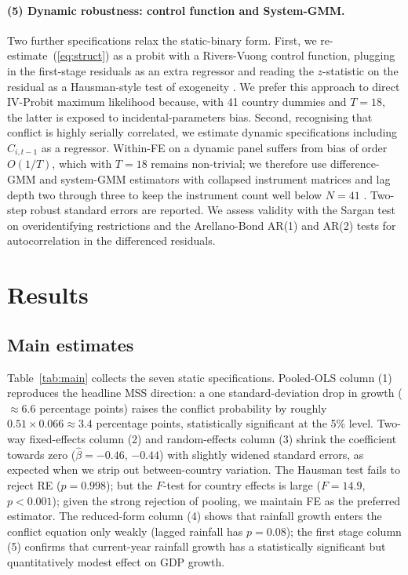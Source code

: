 \documentclass[11pt,a4paper]{article}
\begin{document}
\paragraph{(5) Dynamic robustness: control function and System-GMM.}
Two further specifications relax the static-binary form. First, we
re-estimate~(\ref{eq:struct}) as a probit with a Rivers-Vuong
control function, plugging in the first-stage residuals as an extra
regressor and reading the $z$-statistic on the residual as a
Hausman-style test of exogeneity \citep{Wooldridge2010}. We prefer
this approach to direct IV-Probit maximum likelihood because, with
41 country dummies and $T=18$, the latter is exposed to
incidental-parameters bias. Second, recognising that conflict is highly
serially correlated, we estimate dynamic specifications including
$C_{i,t-1}$ as a regressor. Within-FE on a dynamic panel suffers
from \citet{Nickell1981} bias of order $O(1/T)$, which with $T=18$
remains non-trivial; we therefore use difference-GMM
\citep{ArellanoBond1991} and system-GMM \citep{BlundellBond1998}
estimators with collapsed instrument matrices and lag depth two
through three to keep the instrument count well below $N=41$
\citep{Roodman2009}. Two-step robust standard errors are reported.
We assess validity with the Sargan test on overidentifying
restrictions and the Arellano-Bond AR(1) and AR(2) tests for
autocorrelation in the differenced residuals.

\section{Results}\label{sec:results}
\subsection{Main estimates}
Table~\ref{tab:main} collects the seven static specifications.
Pooled-OLS column (1) reproduces the headline MSS direction: a one
standard-deviation drop in growth ($\approx 6.6$ percentage points)
raises the conflict probability by roughly $0.51\times 0.066\approx
3.4$ percentage points, statistically significant at the 5\% level.
Two-way fixed-effects column (2) and random-effects column (3)
shrink the coefficient towards zero ($\hat\beta=-0.46$, $-0.44$)
with slightly widened standard errors, as expected when we strip out
between-country variation. The Hausman test fails to reject RE
($p=0.998$); but the $F$-test for country effects is large
($F=14.9$, $p<0.001$); given the strong rejection of pooling,
we maintain FE as the preferred estimator. The reduced-form column (4)
shows that rainfall growth enters the conflict equation only weakly
(lagged rainfall has $p=0.08$); the first stage column (5) confirms
that current-year rainfall growth has a statistically significant
but quantitatively modest effect on GDP growth.
\end{document}
